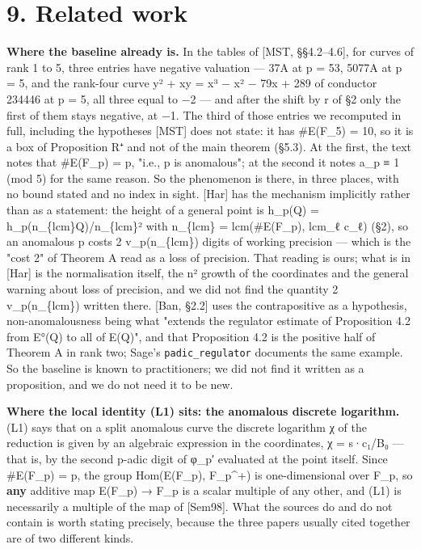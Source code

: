 \documentclass[11pt,a4paper]{article}
\theoremstyle{named}
\begin{document}
\section*{9. Related work}

\textbf{Where the baseline already is.} In the tables of [MST, §§4.2–4.6], for curves of rank 1 to 5, three entries have negative valuation — 37A at p = 53, 5077A at p = 5, and the rank-four curve y² + xy = x³ − x² − 79x + 289 of conductor 234446 at p = 5, all three equal to −2 — and after the shift by r of §2 only the first of them stays negative, at −1. The third of those entries we recomputed in full, including the hypotheses [MST] does not state: it has \#E(F\_5) = 10, so it is a box of Proposition R⁺ and not of the main theorem (§5.3). At the first, the text notes that \#E(F\_p) = p, "i.e., p is anomalous"; at the second it notes a\_p ≡ 1 (mod 5) for the same reason. So the phenomenon is there, in three places, with no bound stated and no index in sight. [Har] has the mechanism implicitly rather than as a statement: the height of a general point is h\_p(Q) = h\_p(n\_\{lcm\}Q)/n\_\{lcm\}² with n\_\{lcm\} = lcm(\#E(F\_p), lcm\_ℓ c\_ℓ) (§2), so an anomalous p costs 2 v\_p(n\_\{lcm\}) digits of working precision — which is the "cost 2" of Theorem A read as a loss of precision. That reading is ours; what is in [Har] is the normalisation itself, the n² growth of the coordinates and the general warning about loss of precision, and we did not find the quantity 2 v\_p(n\_\{lcm\}) written there. [Ban, §2.2] uses the contrapositive as a hypothesis, non-anomalousness being what "extends the regulator estimate of Proposition 4.2 from E°(Q) to all of E(Q)", and that Proposition 4.2 is the positive half of Theorem A in rank two; Sage's \texttt{padic\_\allowbreak{}regulator} documents the same example. So the baseline is known to practitioners; we did not find it written as a proposition, and we do not need it to be new.

\textbf{Where the local identity (L1) sits: the anomalous discrete logarithm.} (L1) says that on a split anomalous curve the discrete logarithm χ of the reduction is given by an algebraic expression in the coordinates, χ = s·c₁/B₀ — that is, by the second p-adic digit of φ\_p′ evaluated at the point itself. Since \#E(F\_p) = p, the group Hom(E(F\_p), F\_p\textasciicircum{}+) is one-dimensional over F\_p, so \textbf{any} additive map E(F\_p) → F\_p is a scalar multiple of any other, and (L1) is necessarily a multiple of the map of [Sem98]. What the sources do and do not contain is worth stating precisely, because the three papers usually cited together are of two different kinds.
\end{document}
